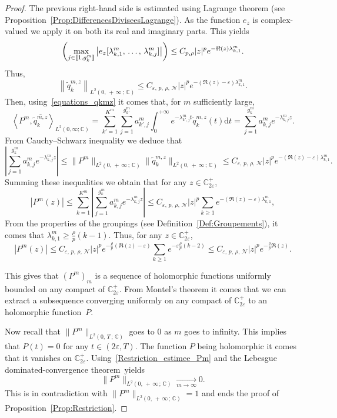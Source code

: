 \documentclass[10pt]{amsart}
\theoremstyle{definition}\newtheorem{defi}[theo]{Definition}\newtheorem{rema}[theo]{Remark}\newtheorem{exam}[theo]{Example}\newtheorem{exem}[theo]{Example}\newtheorem{nota}[theo]{Notation}
\newcommand{\llbracket}{\mathopen{[\mkern -2.7mu[}}
\newcommand{\rrbracket}{\mathclose{]\mkern -2.7mu]}}
\newcommand{\inter}[2]{\llbracket #1,#2 \rrbracket}
\newcommand{\n}{g}
\newcommand{\NN}{\mathcal{N}}
\newcommand{\C}{\mathbb{C}}
\newcommand{\Cpeps}{\mathbb{C}^+_{2\varepsilon}}
\newcommand{\md}{\mathrm{d}}
\begin{document}
\begin{proof}
The previous right-hand side is estimated using Lagrange theorem (see Proposition~\ref{Prop:DifferencesDiviseesLagrange}). As the function $e_z$ is complex-valued we apply it on both its real and imaginary parts. This yields
\[
\left(\max_{j\in \inter{1}{\n^m_k}} \left| e_z[\lambda^m_{k,1},\,\dotsc,\,\lambda^m_{k,j}] \right| \right) \leq C_{p,\rho} |z|^p e^{-\Re(z) \lambda^m_{k,1}}.
\]
Thus,
\[
\left\| \widetilde{q}_k^{m,z}\right\|_{L^2(0,\,+\,\infty\,;\,\C)} \leq C_{\varepsilon,\,p,\,\rho,\,\NN} |z|^p e^{-(\Re(z)-\varepsilon) \lambda^m_{k,1}}.
\]
Then, using~\eqref{equations_qkmz} it comes that, for $m$ sufficiently large,
\[
\left\langle P^m, \overline{\widetilde{q}_k^{m,z}} \right\rangle_{L^2(0,\infty; \C)} = \sum_{k'=1}^{K^m} \sum_{j=1}^{\n_{k'}^m} a_{k',j}^m \int_0^{+\infty} e^{-\lambda^m_{k',j} t} \widetilde{q}_k^{m,z}(t) \md t = \sum_{j=1}^{\n_k^m} a_{k,j}^m e^{-\lambda_{k,j}^m z}.
\]
From Cauchy--Schwarz inequality we deduce that
\[
\left| \sum_{j=1}^{\n_k^m} a_{k,j}^m e^{-\lambda_{k,j}^m z} \right| \leq \| P^m \|_{L^2(0,\,+\,\infty\,;\,\C)} \| \widetilde{q}_k^{m,z} \|_{L^2(0,\,+\,\infty\,;\,\C)} \leq C_{\varepsilon,\,p,\,\rho,\,\NN} |z|^p e^{-(\Re(z)-\varepsilon) \lambda^m_{k,1}}.
\]
Summing these inequalities we obtain that for any $z \in \Cpeps$,
\[
|P^m(z)| \leq \sum_{k=1}^{K^m} \left| \sum_{j=1}^{\n_k^m} a_{k,j}^m e^{-\lambda_{k,j}^m z} \right|
\leq C_{\varepsilon,\,p,\,\rho,\,\NN} |z|^p \sum_{k\geq 1} e^{-(\Re(z)-\varepsilon) \lambda^m_{k,1}},
\]
From the properties of the groupings (see Definition~\ref{Def:Groupements}), it comes that $\lambda^m_{k,1} \geq \frac{\rho}{p} (k-1)$. Thus, for any $z \in \Cpeps$,
\begin{equation}\label{Restriction_estimee_Pm}
|P^m(z)|
\leq C_{\varepsilon,\,p,\,\rho,\,\NN} |z|^p e^{-\frac{\rho}{p} (\Re(z)-\varepsilon)} \sum_{k\geq 1} e^{-\varepsilon \frac{\rho}{p} (k-2)}
\leq C_{\varepsilon,\,p,\,\rho,\,\NN} |z|^p e^{-\frac{\rho}{p} \Re(z)}.
\end{equation}

This gives that $(P^m)_m$ is a sequence of holomorphic functions uniformly bounded on any compact of $\Cpeps$. From Montel's theorem it comes that we can extract a subsequence converging uniformly on any compact of $\Cpeps$ to an holomorphic function~$P$.

Now recall that $\|P^m\|_{L^2(0,\,T\,;\,\C)}$ goes to $0$ as $m$ goes to infinity. This implies that $P(t)=0$ for any $t \in (2 \varepsilon, T)$. The function $P$ being holomorphic it comes that it vanishes on $\Cpeps$. Using~\eqref{Restriction_estimee_Pm} and the Lebesgue dominated-convergence theorem~yields
\[
\|P^m\|_{L^2(0,\,+\,\infty\,;\,\C)} \xrightarrow[m\to \infty]{} 0.
\]
This is in contradiction with $\| P^m \|_{L^2(0,\,+\,\infty\,;\,\C)} =1$ and ends the proof of Proposition~\ref{Prop:Restriction}.
\end{proof}
\end{document}
